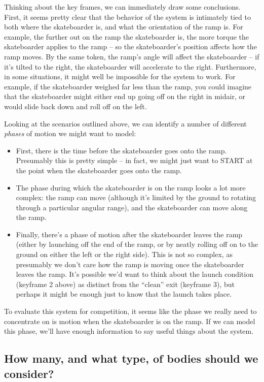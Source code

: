 Thinking about the key frames, we can immediately draw some conclusions.  First, it seems pretty clear that the behavior of the system is intimately tied to both where the skateboarder is, and what the orientation of the ramp is.  For example, the further out on the ramp the skateboarder is, the more torque the skateboarder applies to the ramp -- so the skateboarder's position affects how the ramp moves.  By the same token, the ramp's angle will affect the skateboarder -- if it's tilted to the right, the skateboarder will accelerate to the right.  Furthermore, in some situations, it might well be impossible for the system to work.  For example, if the skateboarder weighed far less than the ramp, you could imagine that the skateboarder might either end up going off on the right in midair, or would slide back down and roll off on the left.

Looking at the scenarios outlined above, we can identify a number of different {\it phases} of motion we might want to model:   
\begin{itemize}
\item First, there is the time before the skateboarder goes onto the ramp.  Presumably this is pretty simple -- in fact, we might just want to START at the point when the skateboarder goes onto the ramp. \item The phase during which the skateboarder is on the ramp looks a lot more complex:  the ramp can move (although it's limited by the ground to rotating through a particular angular range), and the skateboarder can move along the ramp.  
\item Finally, there's a phase of motion after the skateboarder leaves the ramp (either by launching off the end of the ramp, or by neatly rolling off on to the ground on either the left or the right side).  This is not so complex, as presumably we don't care how the ramp is moving once the skateboarder leaves the ramp.  It's possible we'd want to think about the launch condition (keyframe 2 above) as distinct from the ``clean'' exit (keyframe 3), but  perhaps it might be enough just to know that the launch takes place.
\end{itemize}

To evaluate this system for competition, it seems like the phase we really need to concentrate on is  motion when the skateboarder is on the ramp.  If we can model this phase, we'll have enough information to say useful things about the system.

\subsection{How many, and what type, of bodies should we consider?}


